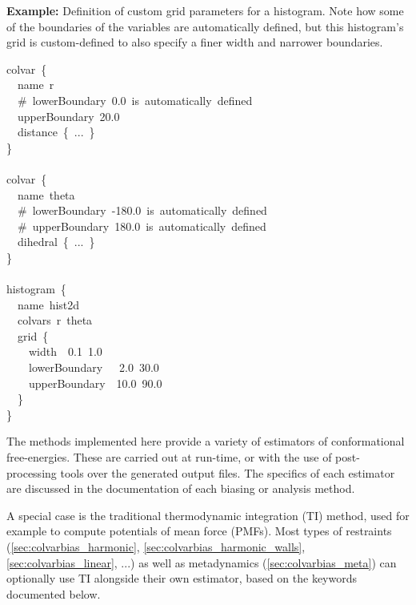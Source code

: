 \noindent\textbf{Example:} Definition of custom grid parameters for a histogram.  Note how some of the boundaries of the variables are automatically defined, but this histogram's grid is custom-defined to also specify a finer width and narrower boundaries.
\begin{cvexampleinput}
\-colvar~\{\\
\-\-~~name~r\\
\-\-~~\#~lowerBoundary~0.0~is~automatically~defined\\
\-\-~~upperBoundary~20.0\\
\-\-~~distance~\{~...~\}\\
\-\}\\
\\
\-colvar~\{\\
\-\-~~name~theta\\
\-\-~~\#~lowerBoundary~-180.0~is~automatically~defined\\
\-\-~~\#~upperBoundary~180.0~is~automatically~defined\\
\-\-~~dihedral~\{~...~\}\\
\-\}\\
\\
\-histogram~\{\\
\-\-~~name~hist2d\\
\-\-~~colvars~r~theta\\
\-\-~~grid~\{\\
\-\-~~~~width~~0.1~1.0\\
\-\-~~~~lowerBoundary~~~2.0~30.0\\
\-\-~~~~upperBoundary~~10.0~90.0\\
\-\-~~\}\\
\-\}\\
\end{cvexampleinput}




The methods implemented here provide a variety of estimators of conformational free-energies.
These are carried out at run-time, or with the use of post-processing tools over the generated output files.
The specifics of each estimator are discussed in the documentation of each biasing or analysis method.

A special case is the traditional thermodynamic integration (TI) method, used for example to compute potentials of mean force (PMFs).
Most types of restraints (\ref{sec:colvarbias_harmonic}, \ref{sec:colvarbias_harmonic_walls}, \ref{sec:colvarbias_linear}, ...) as well as metadynamics (\ref{sec:colvarbias_meta}) can optionally use TI alongside their own estimator, based on the keywords documented below.

